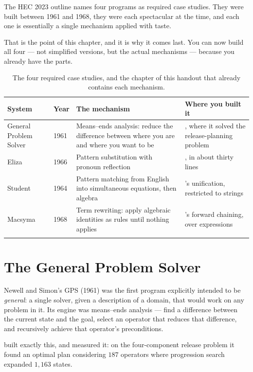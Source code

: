 The HEC 2023 outline names four programs as required case studies. They were built
between 1961 and 1968, they were each spectacular at the time, and each one is
essentially a single mechanism applied with taste.

That is the point of this chapter, and it is why it comes last. You can now build
all four --- not simplified versions, but the actual mechanisms --- because you
already have the parts.

\smallskip
\noindent\begin{longtable}{@{}L{2.4cm}L{1.5cm}L{4.4cm}L{6.2cm}@{}}
\toprule
{}
\textbf{System} & \textbf{Year} & \textbf{The mechanism} & \textbf{Where you built
it} \\
\midrule
\endhead
General Problem Solver & 1961 & Means--ends analysis: reduce the difference between
where you are and where you want to be & , where it solved the
release-planning problem \\
Eliza & 1966 & Pattern substitution with pronoun reflection & , in about
thirty lines \\
Student & 1964 & Pattern matching from English into simultaneous equations, then
algebra & 's unification, restricted to strings \\
Macsyma & 1968 & Term rewriting: apply algebraic identities as rules until nothing
applies & 's forward chaining, over expressions \\
\bottomrule
\caption{The four required case studies, and the chapter of this handout that
already contains each mechanism.}\label{tab:classic}
\end{longtable}

\section{The General Problem Solver}

Newell and Simon's GPS (1961) was the first program explicitly intended to be
\emph{general}: a single solver, given a description of a domain, that would work on
any problem in it. Its engine was means--ends analysis --- find a difference between
the current state and the goal, select an operator that reduces that difference,
and recursively achieve that operator's preconditions.

 built exactly this, and measured it: on the four-component release
problem it found an optimal plan considering $187$ operators where progression
search expanded $1{,}163$ states.

